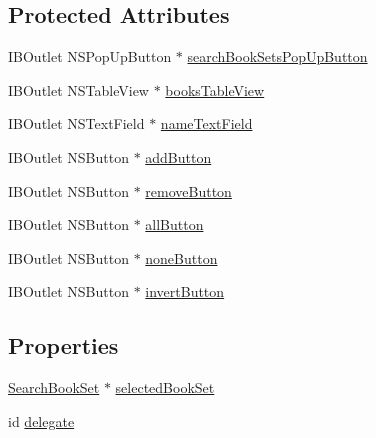 \subsection*{Protected Attributes}
\begin{DoxyCompactItemize}
\item 
I\-B\-Outlet N\-S\-Pop\-Up\-Button $\ast$ \hyperlink{interface_search_book_set_editor_controller_af28f5f0ebf86d25db4df6946bc026c8a}{search\-Book\-Sets\-Pop\-Up\-Button}
\item 
I\-B\-Outlet N\-S\-Table\-View $\ast$ \hyperlink{interface_search_book_set_editor_controller_aa96b288e0749889f2625c216311b4d76}{books\-Table\-View}
\item 
I\-B\-Outlet N\-S\-Text\-Field $\ast$ \hyperlink{interface_search_book_set_editor_controller_a6cc708980e565bf8950efbf83a55fc85}{name\-Text\-Field}
\item 
I\-B\-Outlet N\-S\-Button $\ast$ \hyperlink{interface_search_book_set_editor_controller_a9d8b10d56440d1d294c06a99d4a14df1}{add\-Button}
\item 
I\-B\-Outlet N\-S\-Button $\ast$ \hyperlink{interface_search_book_set_editor_controller_a9275d90cf93b253c020e9d5725309f69}{remove\-Button}
\item 
I\-B\-Outlet N\-S\-Button $\ast$ \hyperlink{interface_search_book_set_editor_controller_a622e891fa3d7dfa26336a2a46c0fc6c0}{all\-Button}
\item 
I\-B\-Outlet N\-S\-Button $\ast$ \hyperlink{interface_search_book_set_editor_controller_a2493097c12d2353a5d5f6691297d3701}{none\-Button}
\item 
I\-B\-Outlet N\-S\-Button $\ast$ \hyperlink{interface_search_book_set_editor_controller_a636d1cbb68848ed766e8dd7d443b607d}{invert\-Button}
\end{DoxyCompactItemize}
\subsection*{Properties}
\begin{DoxyCompactItemize}
\item 
\hyperlink{interface_search_book_set}{Search\-Book\-Set} $\ast$ \hyperlink{interface_search_book_set_editor_controller_a35dcbb446afbd110db22bcdffecb2f8d}{selected\-Book\-Set}
\item 
id \hyperlink{interface_search_book_set_editor_controller_a8d9332fcd23523b1e2520b8765577423}{delegate}
\end{DoxyCompactItemize}


